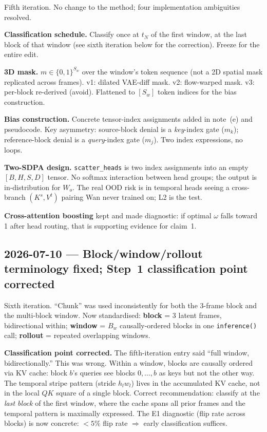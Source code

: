\documentclass{article}
\begin{document}
Fifth iteration. No change to the method; four implementation ambiguities
resolved.

\textbf{Classification schedule.} Classify once at $t_N$ of the first window,
at the last block of that window (see sixth iteration below for the correction).
Freeze for the entire edit.

\textbf{3D mask.} $m \in \{0,1\}^{S_w}$ over the window's token sequence
(not a 2D spatial mask replicated across frames). v1: dilated VAE-diff mask.
v2: flow-warped mask. v3: per-block re-derived (avoid). Flattened to $[S_w]$
token indices for the bias construction.

\textbf{Bias construction.} Concrete tensor-index assignments added in note~(e)
and pseudocode. Key asymmetry: source-block denial is a \emph{key}-index gate
($m_k$); reference-block denial is a \emph{query}-index gate ($m_j$). Two
index expressions, no loops.

\textbf{Two-SDPA design.} \texttt{scatter\_heads} is two index assignments into
an empty $[B,H,S,D]$ tensor. No softmax interaction between head groups; the
output is in-distribution for $W_o$. The real OOD risk is in temporal heads
seeing a cross-branch $(K^s, V^t)$ pairing Wan never trained on; L2 is the test.

\textbf{Cross-attention boosting} kept and made diagnostic: if optimal $\omega$
falls toward 1 after head routing, that is supporting evidence for claim~1.

\subsection*{2026-07-10 --- Block/window/rollout terminology fixed; Step~1 classification point corrected}

Sixth iteration. ``Chunk'' was used inconsistently for both the 3-frame block
and the multi-block window. Now standardised: \textbf{block} = 3 latent frames,
bidirectional within; \textbf{window} = $B_w$ causally-ordered blocks in one
\texttt{inference()} call; \textbf{rollout} = repeated overlapping windows.

\textbf{Classification point corrected.} The fifth-iteration entry said
``full window, bidirectionally.'' This was wrong. Within a window, blocks are
causally ordered via KV cache: block $b$'s queries see blocks $0,\ldots,b$ as
keys but not the other way. The temporal stripe pattern (stride $h_l w_l$) lives
in the accumulated KV cache, not in the local $QK$ square of a single block.
Correct recommendation: classify at the \emph{last block} of the first window,
where the cache spans all prior frames and the temporal pattern is maximally
expressed. The E1 diagnostic (flip rate across blocks) is now concrete:
$<5\%$ flip rate $\Rightarrow$ early classification suffices.
\end{document}
